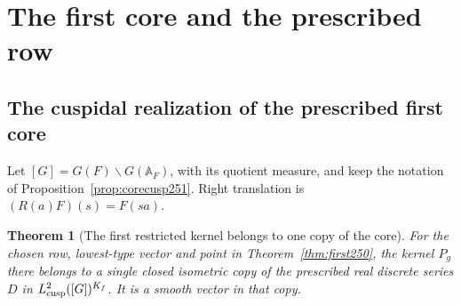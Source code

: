 \documentclass[a4paper,11pt]{article}
\newtheorem{theorem}[proposition]{Theorem}
\theoremstyle{definition}
\theoremstyle{remark}
\numberwithin{equation}{section}
\begin{document}
\section{The first core and the prescribed row}\label{nav:g-VI-1}

\subsection{The cuspidal realization of the prescribed first core}\label{nav:III-40}
Let \([G]=G(F)\backslash G(\mathbb A_F)\), with its quotient measure,
and keep the notation of Proposition~\ref{prop:corecusp251}. Right
translation is \((R(a)F)(s)=F(sa)\).

\begin{theorem}[The first restricted kernel belongs to one copy of the core]
\label{thm:corecopy251}
For the chosen row, lowest-type vector and point in
Theorem~\ref{thm:first250}, the kernel \(P_g\) there belongs to a single
closed isometric copy of the prescribed real discrete series \(D\) in
\(L^2_{\rm cusp}([G])^{K_f}\). It is a smooth vector in that copy.
\end{theorem}
\end{document}
